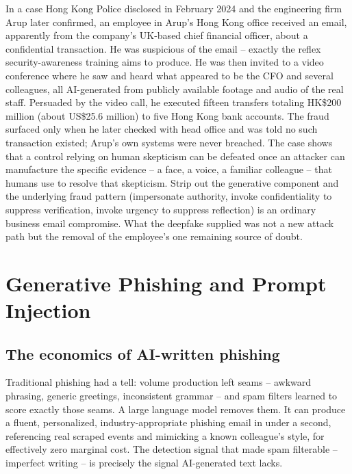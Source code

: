 \begin{example}
In a case Hong Kong Police disclosed in February 2024 and the engineering firm Arup later
confirmed, an employee in Arup's Hong Kong office received an email, apparently from the company's
UK-based chief financial officer, about a confidential transaction. He was
suspicious of the email -- exactly the reflex security-awareness training aims to produce. He was
then invited to a video conference where he saw and heard what appeared to be the CFO and several
colleagues, all AI-generated from publicly available footage and audio of the real staff. Persuaded
by the video call, he executed fifteen transfers totaling HK\$200 million (about US\$25.6 million)
to five Hong Kong bank accounts. The fraud surfaced only when he later checked with head office and
was told no such transaction existed; Arup's own systems were never breached. The case shows that a
control relying on human skepticism can be defeated once an attacker can manufacture the specific
evidence -- a face, a voice, a familiar colleague -- that humans use to resolve that skepticism.
Strip out the generative component and the underlying fraud pattern (impersonate authority, invoke
confidentiality to suppress verification, invoke urgency to suppress reflection) is an ordinary
business email compromise. What the deepfake supplied was not a new attack path but the removal of
the employee's one remaining source of doubt.
\end{example}

\section{Generative Phishing and Prompt Injection}

\subsection{The economics of AI-written phishing}

Traditional phishing had a tell: volume production left seams -- awkward phrasing, generic
greetings, inconsistent grammar -- and spam filters learned to score exactly those seams. A large
language model removes them. It can produce a fluent, personalized, industry-appropriate phishing
email in under a second, referencing real scraped events and mimicking a known colleague's style,
for effectively zero marginal cost. The detection signal that made spam filterable -- imperfect
writing -- is precisely the signal AI-generated text lacks.

